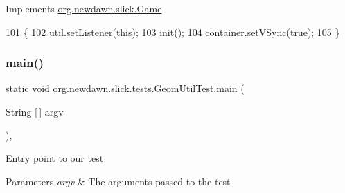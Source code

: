 Implements \mbox{\hyperlink{interfaceorg_1_1newdawn_1_1slick_1_1_game_ad2dd6affab08bb8fdb5fab0815957b7a}{org.\+newdawn.\+slick.\+Game}}.


\begin{DoxyCode}
101                                                                     \{
102         \mbox{\hyperlink{classorg_1_1newdawn_1_1slick_1_1tests_1_1_geom_util_test_a4ba7fef7b2f6d71b04fdb6c3d8de1adf}{util}}.\mbox{\hyperlink{classorg_1_1newdawn_1_1slick_1_1geom_1_1_geom_util_a63310f3321f95f80909ae475187097f9}{setListener}}(\textcolor{keyword}{this});
103         \mbox{\hyperlink{classorg_1_1newdawn_1_1slick_1_1tests_1_1_geom_util_test_ad918b7a75d0de39a5d36d06768a4ae41}{init}}();
104         container.setVSync(\textcolor{keyword}{true});
105     \}
\end{DoxyCode}
\mbox{\label{classorg_1_1newdawn_1_1slick_1_1tests_1_1_geom_util_test_a82de56953442cf1c9b091d9adce82b9c}} 
\subsubsection{\texorpdfstring{main()}{main()}}
{\footnotesize\ttfamily static void org.\+newdawn.\+slick.\+tests.\+Geom\+Util\+Test.\+main (\begin{DoxyParamCaption}\item[{String \mbox{[}$\,$\mbox{]}}]{argv }\end{DoxyParamCaption})\hspace{0.3cm}{\ttfamily [inline]}, {\ttfamily [static]}}

Entry point to our test


\begin{DoxyParams}{Parameters}
{\em argv} & The arguments passed to the test \\
\hline
\end{DoxyParams}


